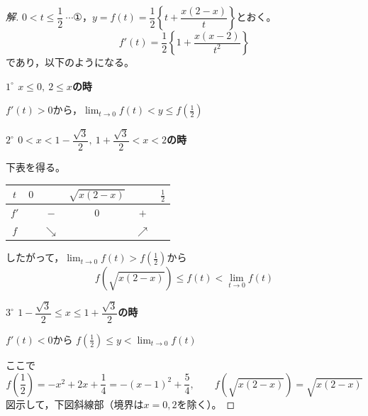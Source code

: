 \documentclass[../main.tex]{subfiles}
\begin{document}
\begin{proof}[解]
  $0<t\le\dfrac12\ \cdots$①，$y=f(t)=\dfrac12\left\{t+\dfrac{x(2-x)}{t}\right\}$とおく。
  \[
    f'(t)=\frac12\left\{1+\frac{x(x-2)}{t^2}\right\}
  \]
  であり，以下のようになる。

  \textbf{$1^\circ$ $x\le0,\ 2\le x$の時}

  $f'(t)>0$から，$\displaystyle\lim_{t\to0}f(t)<y\le f\left(\frac12\right)$

  \textbf{$2^\circ$ $0<x<1-\dfrac{\sqrt3}{2},\ 1+\dfrac{\sqrt3}{2}<x<2$の時}

  下表を得る。
  \begin{center}
    \begin{tabular}{c|ccccc}
      $t$ & $0$ & & $\sqrt{x(2-x)}$ & & $\frac12$ \\
      \hline
      $f'$ & & $-$ & $0$ & $+$ & \\
      \hline
      $f$ & & $\searrow$ & & $\nearrow$ &
    \end{tabular}
  \end{center}
  したがって，$\displaystyle\lim_{t\to0}f(t)>f\left(\frac12\right)$から
  \[
    f(\sqrt{x(2-x)})\le f(t)<\lim_{t\to0}f(t)
  \]

  \textbf{$3^\circ$ $1-\dfrac{\sqrt3}{2}\le x\le1+\dfrac{\sqrt3}{2}$の時}

  $f'(t)<0$から $\displaystyle f\left(\frac12\right)\le y<\lim_{t\to0}f(t)$

  ここで
  \[
    f\left(\frac12\right)=-x^2+2x+\frac14=-(x-1)^2+\frac54, \qquad f(\sqrt{x(2-x)})=\sqrt{x(2-x)}
  \]
  図示して，下図斜線部（境界は$x=0,2$を除く）。


\end{proof}
\end{document}
